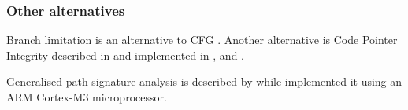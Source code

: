 \subsubsection{Other alternatives}

Branch limitation is an alternative to CFG \cite{He2017} \cite{Corporation2017}.
Another alternative is Code Pointer Integrity described in \cite{Security2017} and implemented in \cite{Kuznetsov:204783},\cite{Mashtizadeh2014} and \cite{Szekeres2013}.

Generalised path signature analysis is described by \cite{Mahmood1988} while \cite{Werner2016} implemented it using an ARM Cortex-M3 microprocessor.